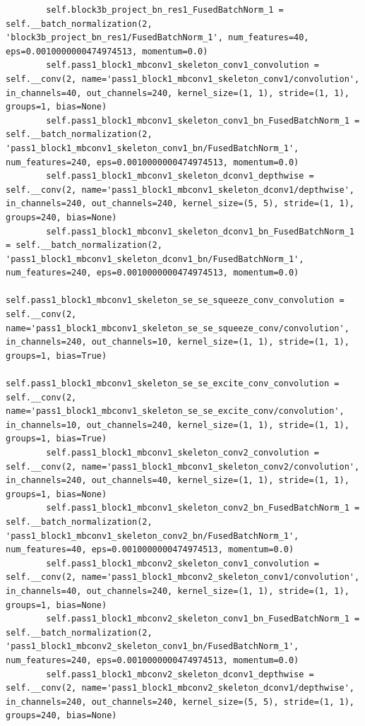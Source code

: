\documentclass{fisatprojectfinal}
\begin{document}
\begin{appendices}
\begin{lstlisting}
        self.block3b_project_bn_res1_FusedBatchNorm_1 = self.__batch_normalization(2, 'block3b_project_bn_res1/FusedBatchNorm_1', num_features=40, eps=0.0010000000474974513, momentum=0.0)
        self.pass1_block1_mbconv1_skeleton_conv1_convolution = self.__conv(2, name='pass1_block1_mbconv1_skeleton_conv1/convolution', in_channels=40, out_channels=240, kernel_size=(1, 1), stride=(1, 1), groups=1, bias=None)
        self.pass1_block1_mbconv1_skeleton_conv1_bn_FusedBatchNorm_1 = self.__batch_normalization(2, 'pass1_block1_mbconv1_skeleton_conv1_bn/FusedBatchNorm_1', num_features=240, eps=0.0010000000474974513, momentum=0.0)
        self.pass1_block1_mbconv1_skeleton_dconv1_depthwise = self.__conv(2, name='pass1_block1_mbconv1_skeleton_dconv1/depthwise', in_channels=240, out_channels=240, kernel_size=(5, 5), stride=(1, 1), groups=240, bias=None)
        self.pass1_block1_mbconv1_skeleton_dconv1_bn_FusedBatchNorm_1 = self.__batch_normalization(2, 'pass1_block1_mbconv1_skeleton_dconv1_bn/FusedBatchNorm_1', num_features=240, eps=0.0010000000474974513, momentum=0.0)
        self.pass1_block1_mbconv1_skeleton_se_se_squeeze_conv_convolution = self.__conv(2, name='pass1_block1_mbconv1_skeleton_se_se_squeeze_conv/convolution', in_channels=240, out_channels=10, kernel_size=(1, 1), stride=(1, 1), groups=1, bias=True)
        self.pass1_block1_mbconv1_skeleton_se_se_excite_conv_convolution = self.__conv(2, name='pass1_block1_mbconv1_skeleton_se_se_excite_conv/convolution', in_channels=10, out_channels=240, kernel_size=(1, 1), stride=(1, 1), groups=1, bias=True)
        self.pass1_block1_mbconv1_skeleton_conv2_convolution = self.__conv(2, name='pass1_block1_mbconv1_skeleton_conv2/convolution', in_channels=240, out_channels=40, kernel_size=(1, 1), stride=(1, 1), groups=1, bias=None)
        self.pass1_block1_mbconv1_skeleton_conv2_bn_FusedBatchNorm_1 = self.__batch_normalization(2, 'pass1_block1_mbconv1_skeleton_conv2_bn/FusedBatchNorm_1', num_features=40, eps=0.0010000000474974513, momentum=0.0)
        self.pass1_block1_mbconv2_skeleton_conv1_convolution = self.__conv(2, name='pass1_block1_mbconv2_skeleton_conv1/convolution', in_channels=40, out_channels=240, kernel_size=(1, 1), stride=(1, 1), groups=1, bias=None)
        self.pass1_block1_mbconv2_skeleton_conv1_bn_FusedBatchNorm_1 = self.__batch_normalization(2, 'pass1_block1_mbconv2_skeleton_conv1_bn/FusedBatchNorm_1', num_features=240, eps=0.0010000000474974513, momentum=0.0)
        self.pass1_block1_mbconv2_skeleton_dconv1_depthwise = self.__conv(2, name='pass1_block1_mbconv2_skeleton_dconv1/depthwise', in_channels=240, out_channels=240, kernel_size=(5, 5), stride=(1, 1), groups=240, bias=None)

\end{lstlisting}
\end{appendices}
\end{document}
